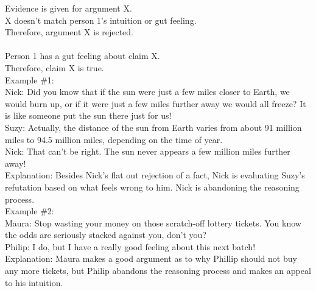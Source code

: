 \documentclass[a4paper,12pt,single,pdftex]{scrartcl}
\begin{document}
    
      Evidence is given for argument X.
    \\

    
      X doesn't match person 1's intuition or gut feeling.
    \\

    
      Therefore, argument X is rejected.
    \\

    
       
    \\

    
      Person 1 has a gut feeling about claim X.
    \\

    
      Therefore, claim X is true.
    \\

    
      Example \#1:
    \\

    
      Nick: Did you know that if the sun were just a few miles closer to Earth, we would burn up, or if it were just a few miles further away we would all freeze? It is like someone put the sun there just for us!
    \\

    
      Suzy: Actually, the distance of the sun from Earth varies from about 91 million miles to 94.5 million miles, depending on the time of year.
    \\

    
      Nick: That can't be right. The sun never appears a few million miles further away!
    \\

    
      Explanation: Besides Nick's flat out rejection of a fact, Nick is evaluating Suzy's refutation based on what feels wrong to him. Nick is abandoning the reasoning process.
    \\

    
      Example \#2:
    \\

    
      Maura: Stop wasting your money on those scratch-off lottery tickets. You know the odds are seriously stacked against you, don't you?
    \\

    
      Philip: I do, but I have a really good feeling about this next batch!
    \\

    
      Explanation: Maura makes a good argument as to why Phillip should not buy any more tickets, but Philip abandons the reasoning process and makes an appeal to his intuition.
    \\
\end{document}
